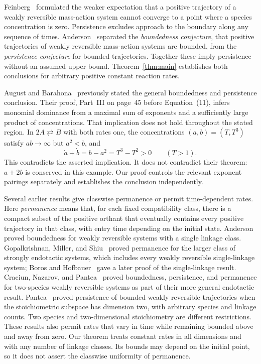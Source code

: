 Feinberg~\cite[Remark~6.1.E]{Feinberg1987} formulated the weaker
expectation that a positive trajectory of a weakly reversible mass-action system
cannot converge to a point where a species concentration is zero.
Persistence excludes approach to the boundary along any sequence of
times. Anderson~\cite[Section~1.1]{Anderson2011} separated the
\emph{boundedness conjecture}, that positive trajectories of weakly
reversible mass-action systems are bounded, from the
\emph{persistence conjecture} for bounded trajectories. Together these
imply persistence without an assumed upper bound.
Theorem~\ref{thm:main} establishes both conclusions for arbitrary
positive constant reaction rates.

August and Barahona~\cite[Theorem~6]{AugustBarahona2010} previously stated
the general boundedness and persistence conclusion. Their proof, Part~III
on page~45 before Equation~(11), infers monomial dominance from a maximal
sum of exponents and a sufficiently large product of concentrations.
That implication does not hold throughout the stated region. In
$2A\rightleftarrows B$ with both rates one, the concentrations
$(a,b)=(T,T^3)$ satisfy $ab\to\infty$ but $a^2<b$, and
\[
 \dot a+\dot b=b-a^2=T^3-T^2>0\qquad(T>1).
\]
This contradicts the asserted implication. It does not contradict their
theorem: $a+2b$ is conserved in this example. Our proof controls the
relevant exponent pairings separately and establishes the conclusion
independently.

Several earlier results give classwise permanence or permit
time-dependent rates. Here \emph{permanence} means that, for each fixed
compatibility class, there is a compact subset of the positive orthant
that eventually contains every positive trajectory in that class, with
entry time depending on the initial state.
Anderson~\cite{Anderson2011} proved boundedness for weakly reversible
systems with a single linkage class. Gopalkrishnan, Miller, and
Shiu~\cite{GopalkrishnanMillerShiu2014} proved permanence for the larger
class of strongly endotactic systems, which includes every weakly
reversible single-linkage system; Boros and
Hofbauer~\cite{BorosHofbauer2020} gave a later proof of the single-linkage
result. Craciun, Nazarov, and Pantea~\cite{CraciunNazarovPantea2013}
proved boundedness, persistence, and permanence for two-species weakly
reversible systems as part of their more general endotactic result.
Pantea~\cite{Pantea2012} proved persistence of bounded weakly reversible
trajectories when the stoichiometric subspace has dimension two, with
arbitrary species and linkage counts. Two species and two-dimensional
stoichiometry are different restrictions. These results also permit
rates that vary in time while remaining bounded above and away from
zero. Our theorem treats constant rates in all dimensions and with any
number of linkage classes. Its bounds may depend on the initial point,
so it does not assert the classwise uniformity of permanence.

